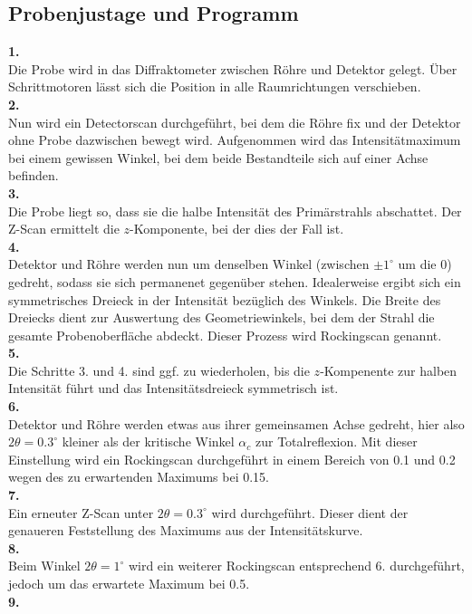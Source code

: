 \subsection{Probenjustage und Programm}
\textbf{1.}\\
Die Probe wird in das Diffraktometer zwischen Röhre und Detektor gelegt. Über Schrittmotoren lässt sich die Position in alle Raumrichtungen verschieben.\\
\textbf{2.}\\
Nun wird ein Detectorscan durchgeführt, bei dem die Röhre fix und der Detektor ohne Probe dazwischen bewegt wird. Aufgenommen wird das Intensitätmaximum
bei einem gewissen Winkel, bei dem beide Bestandteile sich auf einer Achse befinden.
\\ \textbf{3.}\\
Die Probe liegt so, dass sie die halbe Intensität des Primärstrahls abschattet. Der Z-Scan ermittelt die $z$-Komponente, bei der dies der Fall ist.
\\ \textbf{4.}\\
Detektor und Röhre werden nun um denselben Winkel (zwischen $\pm1^\circ$ um die 0) gedreht, sodass sie sich permanenet gegenüber stehen. Idealerweise ergibt
sich ein symmetrisches Dreieck in der Intensität bezüglich des Winkels. Die Breite des Dreiecks dient zur Auswertung des Geometriewinkels, bei dem der Strahl
die gesamte Probenoberfläche abdeckt. Dieser Prozess wird Rockingscan genannt.
\\ \textbf{5.}\\
Die Schritte 3. und 4. sind ggf. zu wiederholen, bis die $z$-Kompenente zur halben Intensität führt und das Intensitätsdreieck symmetrisch ist.
\\ \textbf{6.}\\
Detektor und Röhre werden etwas aus ihrer gemeinsamen Achse gedreht, hier also $2\theta = 0.3^\circ$ kleiner als der kritische Winkel $\alpha_c$ zur Totalreflexion.
Mit dieser Einstellung wird ein Rockingscan durchgeführt in einem Bereich von 0.1 und 0.2 wegen des zu erwartenden Maximums bei 0.15.
\\ \textbf{7.}\\
Ein erneuter Z-Scan unter $2\theta=0.3^\circ$ wird durchgeführt. Dieser dient der genaueren Feststellung des Maximums aus der Intensitätskurve. 
\\ \textbf{8.}\\
Beim Winkel $2\theta=1^\circ$ wird ein weiterer Rockingscan entsprechend 6. durchgeführt, jedoch um das erwartete Maximum bei 0.5.
\\ \textbf{9.}\\
